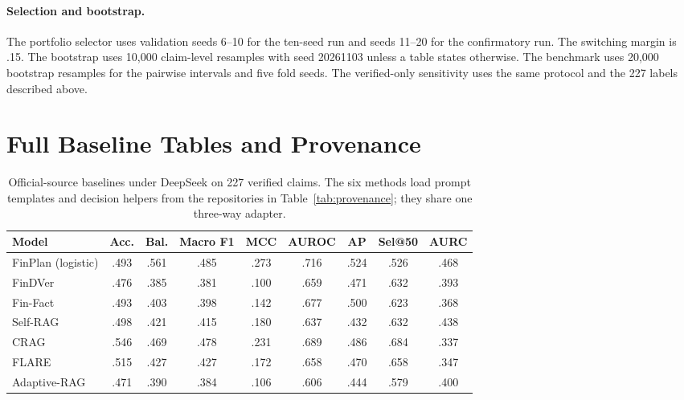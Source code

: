 \documentclass[11pt]{article}
\newcommand{\method}{FinPlan}
\begin{document}
\paragraph{Selection and bootstrap.}
The portfolio selector uses validation seeds 6--10 for the ten-seed run and seeds 11--20 for the confirmatory run. The switching margin is .15. The bootstrap uses 10,000 claim-level resamples with seed 20261103 unless a table states otherwise. The benchmark uses 20,000 bootstrap resamples for the pairwise intervals and five fold seeds. The verified-only sensitivity uses the same protocol and the 227 labels described above.

\section{Full Baseline Tables and Provenance}
\label{app:baselines}

\begin{table}[t]
\centering
\small
\setlength{\tabcolsep}{3pt}
\begin{tabular}{lcccccccc}
\toprule
Model & Acc. & Bal. & Macro F1 & MCC & AUROC & AP & Sel@50 & AURC \\
\midrule
\method{} (logistic) & .493 & .561 & .485 & .273 & .716 & .524 & .526 & .468 \\
FinDVer & .476 & .385 & .381 & .100 & .659 & .471 & .632 & .393 \\
Fin-Fact & .493 & .403 & .398 & .142 & .677 & .500 & .623 & .368 \\
Self-RAG & .498 & .421 & .415 & .180 & .637 & .432 & .632 & .438 \\
CRAG & .546 & .469 & .478 & .231 & .689 & .486 & .684 & .337 \\
FLARE & .515 & .427 & .427 & .172 & .658 & .470 & .658 & .347 \\
Adaptive-RAG & .471 & .390 & .384 & .106 & .606 & .444 & .579 & .400 \\
\bottomrule
\end{tabular}
\caption{Official-source baselines under DeepSeek on 227 verified claims. The six methods load prompt templates and decision helpers from the repositories in Table~\ref{tab:provenance}; they share one three-way adapter.}
\label{tab:deepseek-full}
\end{table}
\end{document}
